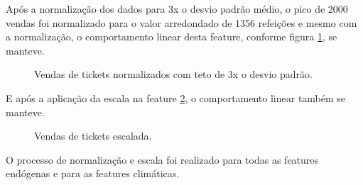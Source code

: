 \documentclass[	12pt, Times, openright, twoside, a4paper, english, brazil]{abntex2}
\begin{document}
                    Após a normalização dos dados para 3x o desvio padrão médio, o pico de 2000 vendas foi normalizado para o valor arredondado de 1356 refeições e mesmo com a normalização, o comportamento linear desta feature, conforme figura \ref{fig:feature_sem_outliers}, se manteve.
                    \begin{figure}[!ht]
                    	\caption{Vendas de tickets normalizados com teto de 3x o desvio padrão. \label{fig:feature_sem_outliers} }
                    \end{figure}
                    E após a aplicação da escala na feature \ref{fig:feature_sem_outliers_escalada}, o comportamento linear também se manteve.
                    \begin{figure}[!ht]
                    	\caption{Vendas de tickets escalada. \label{fig:feature_sem_outliers_escalada} }
                    \end{figure}
                    
                    O processo de normalização e escala foi realizado para todas as features endógenas e para as features climáticas.
                    
\end{document}
